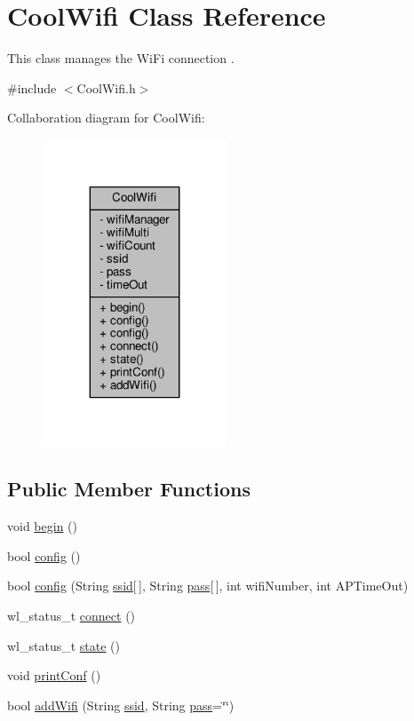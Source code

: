 \hypertarget{classCoolWifi}{}\section{Cool\+Wifi Class Reference}
\label{classCoolWifi}


This class manages the Wi\+Fi connection .  




{\ttfamily \#include $<$Cool\+Wifi.\+h$>$}



Collaboration diagram for Cool\+Wifi\+:\nopagebreak
\begin{figure}[H]
\begin{center}
\leavevmode
\includegraphics[width=155pt]{classCoolWifi__coll__graph}
\end{center}
\end{figure}
\subsection*{Public Member Functions}
\begin{DoxyCompactItemize}
\item 
void \hyperlink{classCoolWifi_a46942fed90e475112cc10b78a32e7aaa}{begin} ()
\item 
bool \hyperlink{classCoolWifi_a4eb2f6b9b09dd588964b88b6c70122c0}{config} ()
\item 
bool \hyperlink{classCoolWifi_a871d4a0d9978f17fdf6d874fc2958b6c}{config} (String \hyperlink{classCoolWifi_a893b21d0fed821438733bba2e73fb4c2}{ssid}\mbox{[}$\,$\mbox{]}, String \hyperlink{classCoolWifi_a0c3332a149245aaad060b32593a54c9b}{pass}\mbox{[}$\,$\mbox{]}, int wifi\+Number, int A\+P\+Time\+Out)
\item 
wl\+\_\+status\+\_\+t \hyperlink{classCoolWifi_ad060353050f40d032a2dbf9e54a768bf}{connect} ()
\item 
wl\+\_\+status\+\_\+t \hyperlink{classCoolWifi_a1c7b4d82a4098d346e7593dce92039fa}{state} ()
\item 
void \hyperlink{classCoolWifi_a9e6105c6d13d35ec510f6633da9e0223}{print\+Conf} ()
\item 
bool \hyperlink{classCoolWifi_a914d7a1df14dd6b75345fb614c34e9d6}{add\+Wifi} (String \hyperlink{classCoolWifi_a893b21d0fed821438733bba2e73fb4c2}{ssid}, String \hyperlink{classCoolWifi_a0c3332a149245aaad060b32593a54c9b}{pass}=\char`\"{}\char`\"{})
\end{DoxyCompactItemize}
